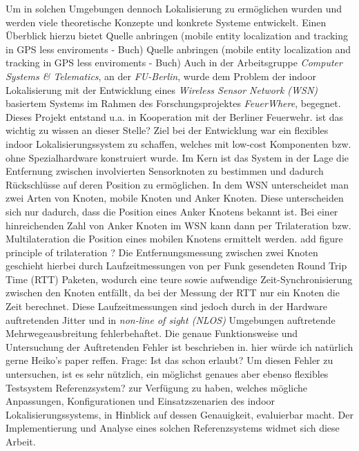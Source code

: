 Um in solchen Umgebungen dennoch Lokalisierung zu ermöglichen wurden und werden
viele theoretische Konzepte und konkrete Systeme entwickelt. Einen Überblick
hierzu bietet {\color{red}Quelle anbringen (mobile entity localization and
tracking in GPS less enviroments - Buch)} Quelle anbringen (mobile entity
localization and tracking in GPS less enviroments - Buch) Auch in der
Arbeitsgruppe \textit{Computer Systems \& Telematics}, an der
\textit{FU-Berlin}, wurde dem Problem der indoor Lokalisierung mit der
Entwicklung eines \textit{Wireless Sensor Network (WSN)} basiertem Systems im
Rahmen des Forschungsprojektes \textit{FeuerWhere}, begegnet.  Dieses Projekt
entstand u.a. in Kooperation mit der Berliner Feuerwehr.  {\color{red}ist das
wichtig zu wissen an dieser Stelle?} Ziel bei der Entwicklung war ein flexibles
indoor Lokalisierungssystem zu schaffen, welches mit low-cost Komponenten bzw.
ohne Spezialhardware konstruiert wurde.  Im Kern ist das System in der Lage die
Entfernung zwischen involvierten Sensorknoten zu bestimmen und dadurch
Rückschlüsse auf deren Position zu ermöglichen.  In dem WSN unterscheidet man
zwei Arten von Knoten, mobile Knoten und Anker Knoten.  Diese unterscheiden
sich nur dadurch, dass die Position eines Anker Knotens bekannt ist.  Bei einer
hinreichenden Zahl von Anker Knoten im WSN kann dann per Trilateration bzw.
Multilateration die Position eines mobilen Knotens ermittelt werden.
{\color{red} add figure principle of trilateration ?} Die Entfernungsmessung
zwischen zwei Knoten geschieht hierbei durch Laufzeitmessungen von per Funk
gesendeten Round Trip Time (RTT) Paketen, wodurch eine teure sowie aufwendige
Zeit-Synchronisierung zwischen den Knoten entfällt, da bei der Messung der RTT
nur ein Knoten die Zeit berechnet.  Diese Laufzeitmessungen sind jedoch durch
in der Hardware auftretenden Jitter und in \textit{non-line of sight (NLOS)}
Umgebungen auftretende Mehrwegeausbreitung fehlerbehaftet.  Die genaue
Funktionsweise und Untersuchung der Auftretenden Fehler ist beschrieben in.
{\color{red} hier würde ich natürlich gerne Heiko's paper reffen. Frage: Ist
das schon erlaubt?} Um diesen Fehler zu untersuchen, ist es sehr nützlich, ein
möglichst genaues aber ebenso flexibles Testsystem {\color{red}Referenzsystem?}
zur Verfügung zu haben, welches mögliche Anpassungen, Konfigurationen und
Einsatzszenarien des indoor Lokalisierungssystems, in Hinblick auf dessen
Genauigkeit, evaluierbar macht.  Der Implementierung und Analyse eines solchen
Referenzsystems widmet sich diese Arbeit. 


